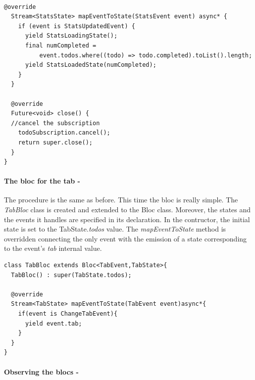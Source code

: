   \begin{code}
\mbox{}\\
 \mbox{}
\label{code:2.14}
\begin{verbatim}
@override
  Stream<StatsState> mapEventToState(StatsEvent event) async* {
    if (event is StatsUpdatedEvent) {
      yield StatsLoadingState();
      final numCompleted =
          event.todos.where((todo) => todo.completed).toList().length;
      yield StatsLoadedState(numCompleted);
    }
  }

  @override
  Future<void> close() {
  //cancel the subscription
    todoSubscription.cancel();
    return super.close();
  }
}
\end{verbatim}
\mbox{}
\end{code}


\paragraph{The bloc for the tab - }
\label{subpar:todo_app_bloc_core_state}

The procedure is the same as before. This time the bloc is really simple.  The \textit{TabBloc }class is created and extended to the Bloc class. Moreover, the states and the events it handles are specified in its declaration.  In the contructor, the initial state is set to the TabState.\textit{todos} value. The \textit{mapEventToState} method is overridden connecting the only event with the emission of a state corresponding to the event's \textit{tab} internal value.

\begin{code}
\mbox{}
 \mbox{}
\label{code:2.14}
\begin{verbatim}
class TabBloc extends Bloc<TabEvent,TabState>{
  TabBloc() : super(TabState.todos);

  @override
  Stream<TabState> mapEventToState(TabEvent event)async*{
    if(event is ChangeTabEvent){
      yield event.tab;
    }
  }
}
\end{verbatim}
\mbox{}
\end{code}
\paragraph{Observing the blocs - }
\label{subpar:todo_app_bloc_core_state}


